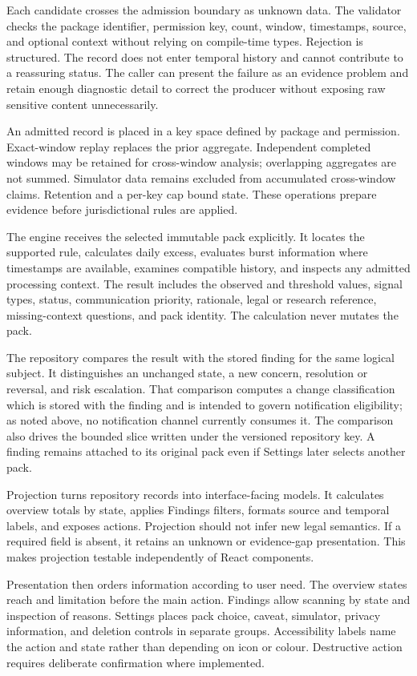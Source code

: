 Each candidate crosses the admission boundary as unknown data. The validator checks the package identifier, permission key, count, window, timestamps, source, and optional context without relying on compile-time types. Rejection is structured. The record does not enter temporal history and cannot contribute to a reassuring status. The caller can present the failure as an evidence problem and retain enough diagnostic detail to correct the producer without exposing raw sensitive content unnecessarily.

An admitted record is placed in a key space defined by package and permission. Exact-window replay replaces the prior aggregate. Independent completed windows may be retained for cross-window analysis; overlapping aggregates are not summed. Simulator data remains excluded from accumulated cross-window claims. Retention and a per-key cap bound state. These operations prepare evidence before jurisdictional rules are applied.

The engine receives the selected immutable pack explicitly. It locates the supported rule, calculates daily excess, evaluates burst information where timestamps are available, examines compatible history, and inspects any admitted processing context. The result includes the observed and threshold values, signal types, status, communication priority, rationale, legal or research reference, missing-context questions, and pack identity. The calculation never mutates the pack.

The repository compares the result with the stored finding for the same logical subject. It distinguishes an unchanged state, a new concern, resolution or reversal, and risk escalation. That comparison computes a change classification which is stored with the finding and is intended to govern notification eligibility; as noted above, no notification channel currently consumes it. The comparison also drives the bounded slice written under the versioned repository key. A finding remains attached to its original pack even if Settings later selects another pack.

Projection turns repository records into interface-facing models. It calculates overview totals by state, applies Findings filters, formats source and temporal labels, and exposes actions. Projection should not infer new legal semantics. If a required field is absent, it retains an unknown or evidence-gap presentation. This makes projection testable independently of React components.

Presentation then orders information according to user need. The overview states reach and limitation before the main action. Findings allow scanning by state and inspection of reasons. Settings places pack choice, caveat, simulator, privacy information, and deletion controls in separate groups. Accessibility labels name the action and state rather than depending on icon or colour. Destructive action requires deliberate confirmation where implemented.


